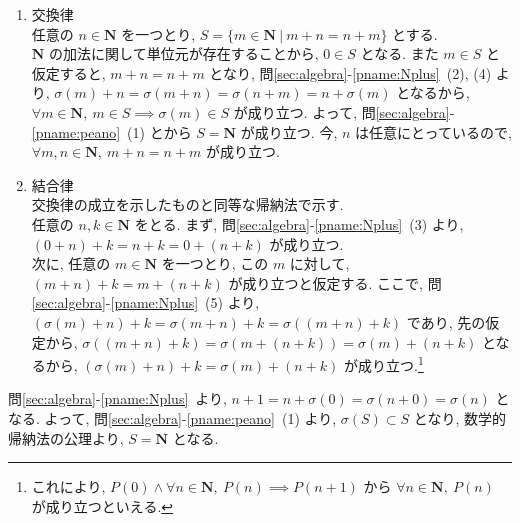 \begin{nmprob}
{\begin{enumerate}
    \item 交換律\\
    任意の $n \in \bm{N}$ を一つとり, $S = \{ m \in \bm{N}\ |\ m + n = n + m\}$ とする.\\
    $\bm{N}$ の加法に関して単位元が存在することから, $0 \in S$ となる.
    また $m \in S$ と仮定すると, $m + n = n + m$ となり, 問\ref{sec:algebra}-\ref{pname:Nplus}\ (2), (4) より,
    $\sigma (m) + n = \sigma (m + n) = \sigma (n + m) = n + \sigma (m)$ となるから, $\forall m \in \bm{N},\ m \in S \implies \sigma (m) \in S$ が成り立つ.
    よって, 問\ref{sec:algebra}-\ref{pname:peano}\ (1) とから $S = \bm{N}$ が成り立つ. 今, $n$ は任意にとっているので, $\forall m, n\in \bm{N},\ m + n = n + m$ が成り立つ.
    \item 結合律\\
    交換律の成立を示したものと同等な帰納法で示す.\\
    任意の $n, k \in \bm{N}$ をとる. まず, 問\ref{sec:algebra}-\ref{pname:Nplus}\ (3) より, $(0 + n) + k = n + k = 0 + (n + k)$ が成り立つ.\\
    次に, 任意の $m \in \bm{N}$ を一つとり, この $m$ に対して, $(m + n) + k = m + (n + k)$ が成り立つと仮定する.
    ここで, 問\ref{sec:algebra}-\ref{pname:Nplus}\ (5) より, $(\sigma (m) + n) + k = \sigma (m + n) + k = \sigma ((m + n) + k)$ であり, 先の仮定から, $\sigma ((m + n) + k) = \sigma (m + (n + k)) = \sigma (m) + (n + k)$
    となるから, $(\sigma (m) + n) + k = \sigma (m) + (n + k)$ が成り立つ.\footnote[4]{これにより, $P(0) \land \forall n \in \bm{N},\ P(n) \implies P(n + 1)$ から $\forall n \in \bm{N},\ P(n)$ が成り立つといえる.}
\end{enumerate}
\item 問\ref{sec:algebra}-\ref{pname:Nplus}\ より, $n + 1 = n + \sigma (0) = \sigma (n + 0) = \sigma (n)$ となる.
よって, 問\ref{sec:algebra}-\ref{pname:peano}\ (1) より, $\sigma (S) \subset S$ となり, 数学的帰納法の公理より, $S = \bm{N}$ となる.
}
\makeatletter\tagsleft@false\makeatother
\end{nmprob}
